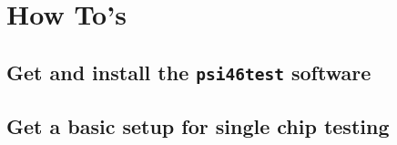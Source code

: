 \chapter{How To's}
\label{sec:howto}

\section{Get and install the \texttt{psi46test} software}

\section{Get a basic setup for single chip testing}

